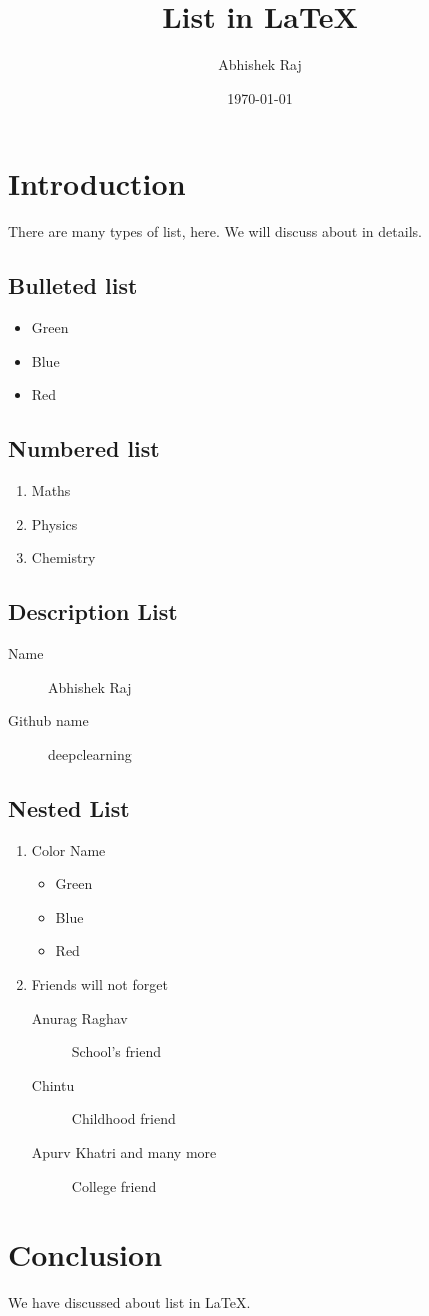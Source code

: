 \documentclass{article}
\title{List in \LaTeX}
\author{Abhishek Raj}
\date{\today}
\begin{document}
	\maketitle
	
	\section{Introduction}
	There are many types of list, here. We will discuss about in details.
	
	\subsection{Bulleted list} 
	\begin{itemize}
		\item Green
		\item Blue
		\item Red
	\end{itemize}

	\subsection{Numbered list}
	\begin{enumerate}
		\item Maths
		\item Physics
		\item Chemistry
	\end{enumerate}

	\subsection{Description List}
	\begin{description}
		\item[Name] Abhishek Raj
		\item[Github name] deepclearning
	\end{description}

	\subsection{Nested List}
	\begin{enumerate}
		\item Color Name
		\begin{itemize}
			\item Green
			\item Blue
			\item Red
		\end{itemize}
		
		\item Friends will not forget
		\begin{description}
			\item[Anurag Raghav] School's friend
			\item[Chintu] Childhood friend
			\item [Apurv Khatri and many more] College friend
		\end{description}
	\end{enumerate}
	\section{Conclusion}
	We have discussed about list in \LaTeX.
\end{document}
